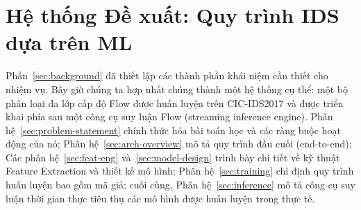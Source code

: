\section{Hệ thống Đề xuất: Quy trình IDS dựa trên ML}
\label{sec:models}

Phần~\ref{sec:background} đã thiết lập các thành phần khái niệm cần thiết cho nhiệm vụ. Bây giờ chúng ta hợp nhất chúng thành một hệ thống cụ thể: một bộ phân loại đa lớp cấp độ Flow được huấn luyện trên CIC-IDS2017 và được triển khai phía sau một công cụ suy luận Flow (streaming inference engine). Phân hệ~\ref{sec:problem-statement} chính thức hóa bài toán học và các ràng buộc hoạt động của nó; Phân hệ~\ref{sec:arch-overview} mô tả quy trình đầu cuối (end-to-end); Các phân hệ~\ref{sec:feat-eng} và~\ref{sec:model-design} trình bày chi tiết về kỹ thuật Feature Extraction và thiết kế mô hình; Phân hệ~\ref{sec:training} chỉ định quy trình huấn luyện bao gồm mã giả; cuối cùng, Phân hệ~\ref{sec:inference} mô tả công cụ suy luận thời gian thực tiêu thụ các mô hình được huấn luyện trong thực tế.












